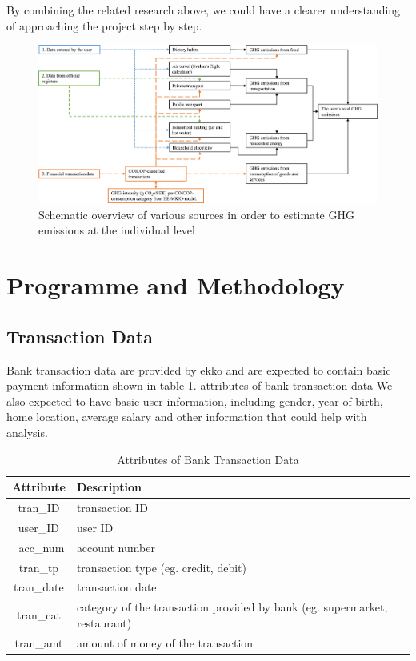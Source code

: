 \documentclass[a4paper,11pt]{article}
\begin{document}
By combining the related research above, we could have a clearer understanding of approaching the project step by step.


\begin{figure}
    \centering
    \includegraphics[width=\linewidth]{diagrams/cb_app_source}
    \caption{Schematic overview of various sources in order to estimate GHG emissions at the individual level}
    \label{cb_app_source}
\end{figure}

\section{Programme and Methodology}

\subsection{Transaction Data}
Bank transaction data are provided by ekko and are expected to contain basic payment information shown in table \ref{bank_data}.
attributes of bank transaction data
We also expected to have basic user information, including gender, year of birth, home location, average salary and other information that could help with analysis.
\begin{table}[htbp]
    \begin{center}
        \begin{tabular}{|c|l|}
        \hline
        \textbf{Attribute} & \textbf{Description} \\
        \hline
        tran\_ID & transaction ID\\
        user\_ID & user ID \\\
        acc\_num & account number \\
        tran\_tp & transaction type (eg. credit, debit) \\
        tran\_date & transaction date \\
        tran\_cat & category of the transaction provided by bank (eg. supermarket, restaurant)\\
        tran\_amt & amount of money of the transaction \\
        \hline
        \end{tabular} 
    \end{center}
    \caption{Attributes of Bank Transaction Data}
    \label{bank_data}
\end{table}
\end{document}
